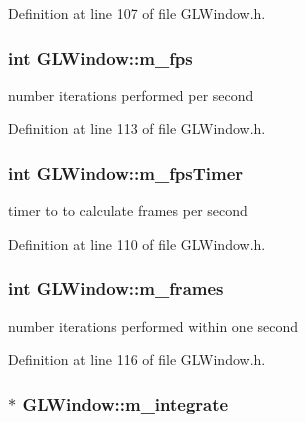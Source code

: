 Definition at line 107 of file GLWindow.h.

\hypertarget{class_g_l_window_a83e019efd2becc005d6bf4493fc3adb2}{
\subsubsection[{m\_\-fps}]{\setlength{\rightskip}{0pt plus 5cm}int {\bf GLWindow::m\_\-fps}}}
\label{class_g_l_window_a83e019efd2becc005d6bf4493fc3adb2}


number iterations performed per second 



Definition at line 113 of file GLWindow.h.

\hypertarget{class_g_l_window_a4f6b732547e0cfd593c1933d5e497ee6}{
\subsubsection[{m\_\-fpsTimer}]{\setlength{\rightskip}{0pt plus 5cm}int {\bf GLWindow::m\_\-fpsTimer}}}
\label{class_g_l_window_a4f6b732547e0cfd593c1933d5e497ee6}


timer to to calculate frames per second 



Definition at line 110 of file GLWindow.h.

\hypertarget{class_g_l_window_a86818489d82e1e6a19d35ded614af48c}{
\subsubsection[{m\_\-frames}]{\setlength{\rightskip}{0pt plus 5cm}int {\bf GLWindow::m\_\-frames}}}
\label{class_g_l_window_a86818489d82e1e6a19d35ded614af48c}


number iterations performed within one second 



Definition at line 116 of file GLWindow.h.

\hypertarget{class_g_l_window_ad6c4fad61e643038bdf0d6bdb0fc1978}{
\subsubsection[{m\_\-integrate}]{$\ast$ {\bf GLWindow::m\_\-integrate}}}
\label{class_g_l_window_ad6c4fad61e643038bdf0d6bdb0fc1978}


